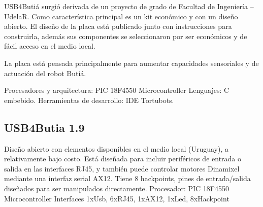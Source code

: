 
USB4Butiá surgió derivada de un proyecto de grado de Facultad de
Ingeniería – UdelaR.
Como característica principal es un kit económico y con un diseño abierto.
El diseño de la placa está publicado junto con instrucciones para construirla,
además sus componentes se seleccionaron por ser económicos
y de fácil acceso en el medio local.

La placa está pensada principalmente para aumentar capacidades sensoriales
y de actuación del robot Butiá.

Procesadores y arquitectura: PIC 18F4550 Microcontroller
Lenguajes: C embebido.
Herramientas de desarrollo: IDE Tortubots.

\subsection{USB4Butia 1.9}
Diseño abierto con elementos disponibles en el medio local (Uruguay), a relativamente bajo costo.
Está diseñada para incluir periféricos de entrada o salida en las interfaces RJ45, y también puede controlar motores Dinamixel mediante una interfaz serial AX12.
Tiene 8 hackpoints, pines de entrada/salida diseñados para ser manipulados directamente.
Procesador:
PIC 18F4550 Microcontroller
Interfaces
1xUsb, 6xRJ45, 1xAX12, 1xLed, 8xHackpoint


